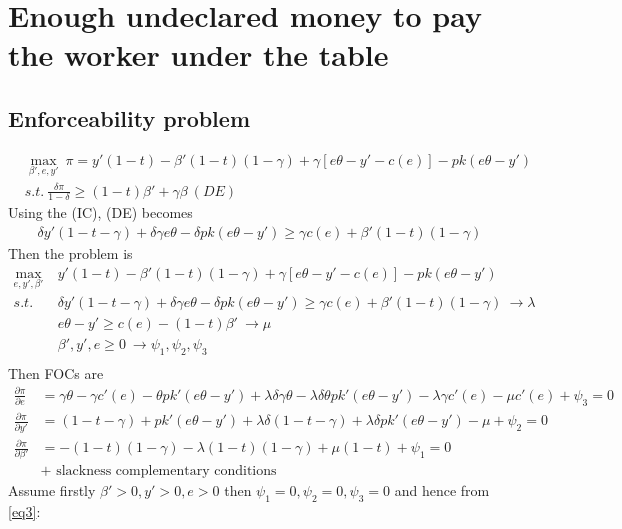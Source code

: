 \documentclass[a4paper]{article}
\begin{document}
\section{Enough undeclared money to pay the worker under the table}
\subsection{Enforceability problem}
\begin{align*}
&\underset{\beta', e, y'}{\max}\ \pi = y'(1 - t) - \beta'(1-t)(1 - \gamma) + \gamma[e\theta - y' - c(e)] - pk(e\theta - y')\\
&s.t.\ \frac{\delta \pi}{1 - \delta} \ge (1-t)\beta' + \gamma \beta\ (DE) 
\end{align*}
Using the (IC), (DE) becomes
\begin{align*}
\delta y'(1 - t - \gamma) + \delta \gamma e \theta - \delta p k(e \theta - y') \ge \gamma c(e) + \beta'(1-t)(1 - \gamma)
\end{align*}
Then the problem is
\begin{align*}
\underset{e, y', \beta'}{\max}\ &y'(1 - t) - \beta'(1-t)(1 - \gamma) + \gamma[e\theta - y' - c(e)] - pk(e\theta - y')\\
s.t.\ &\delta y'(1 - t - \gamma) + \delta \gamma e \theta - \delta p k(e \theta - y') \ge \gamma c(e) + \beta'(1-t)(1 - \gamma)\ \to \lambda \\
& e\theta - y' \ge c(e) - (1 - t)\beta'\ \to \mu \\
& \beta', y', e \ge 0\ \to \psi_1, \psi_2, \psi_3\ \\
\end{align*}
Then FOCs are 
\begin{align}
\frac{\partial \pi}{\partial e} &= \gamma \theta - \gamma c'(e)- \theta p k'(e \theta - y') + \lambda \delta \gamma \theta - \lambda \delta \theta pk'(e \theta - y') - \lambda \gamma c'(e) - \mu c'(e) + \psi_3= 0\label{eq1}\\
\frac{\partial \pi}{\partial y'} &= (1 - t - \gamma)+pk'(e\theta - y') + \lambda \delta (1 - t - \gamma) +\lambda \delta pk'(e\theta - y') - \mu + \psi_2 = 0\label{eq2}\\
\frac{\partial \pi}{\partial \beta'} &= -(1-t)(1-\gamma) - \lambda (1-t)(1-\gamma) + \mu(1 - t) + \psi_1= 0\label{eq3}\\
&+\text{ slackness complementary conditions}\nonumber
\end{align}
Assume firstly $\beta' > 0, y' > 0, e > 0$ then $\psi_1 = 0, \psi_2 = 0, \psi_3= 0$ and hence from \eqref{eq3}:
\end{document}
